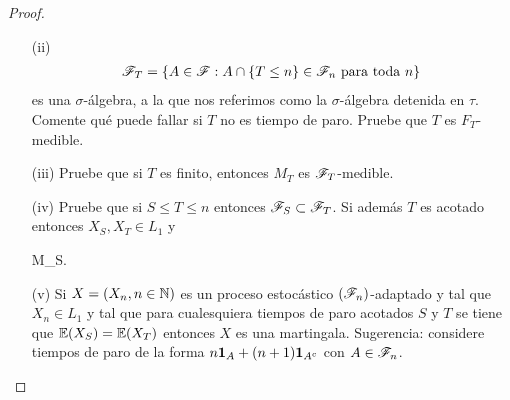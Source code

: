 \begin{proof}
\begin{enumerate}
                \item[(ii)] 
                	\begin{align}
                		\mathscr{F}_T=\left\{ A\in\mathscr{F}:A\cap\left\{ T\leq n\right\} \in\mathscr{F}_n\text{ para toda } n\right\} 
                	\end{align}
                	es una $\sigma$-\'algebra, 
                	a la que nos referimos como la $\sigma$-\'algebra detenida en $\tau$. Comente qu\'e puede fallar si $T$ no es tiempo de paro. 
                	Pruebe que $T$ es $F_T$-medible. 
                
                \item[(iii)] 
                	Pruebe que si $T$ es finito, entonces $M_T$ es $\mathscr{F}_T$-medible.
                
                \item[(iv)] 
                	Pruebe que si $S\leq T\leq n$ entonces $\mathscr{F}_S\subset\mathscr{F}_T$. Si adem\'as $T$ es acotado entonces $X_S,X_T\in L_1$ y 
                	\begin{esn}
	                	\leq M_S.
                	\end{esn}

                \item[(v)] 
                	Si $X=\left( X_n,n\in\mathbb{N}\right) $ es un proceso estoc\'astico $\left( \mathscr{F}_n\right) $-adaptado y tal que $X_n\in L_1$ y tal que 
                	para cualesquiera tiempos de paro acotados $S$ y $T$ se tiene que $\mathbb{E}\! \left( X_S \right)=\mathbb{E}\! \left( X_T \right)$ entonces $X$ es una 
                	martingala. Sugerencia: considere tiempos de paro de la forma $n{\bf{1}}_{A}+(n+1){\bf{1}}_{A^c}$ con $A\in\mathscr{F}_n$.
\end{enumerate}
\end{proof}